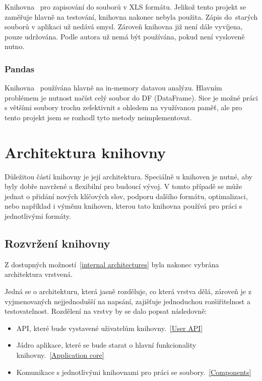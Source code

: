 Knihovna~\cite{xlwt} pro zapisování do souborů v XLS formátu. Jelikož tento projekt se zaměřuje hlavně na testování, knihovna nakonec nebyla použita. Zápis do~starých souborů v aplikaci už nedává smysl. Zároveň knihovna již není dále vyvíjena, pouze udržována. Podle autora už nemá být používána, pokud není vysloveně nutno.~\cite{xlwtEnd}

\subsubsection{Pandas}
\label{subsubsec:pandas}

Knihovna~\cite{Pandas} používána hlavně na in-memory datavou analýzu. Hlavním problémem je nutnost načíst celý soubor do DF (DataFrame). Sice je možné práci s většími soubory trochu zefektivnit s ohledem na využívanou paměť, ale pro tento projekt jsem se rozhodl tyto metody neimplementovat.~\cite{PandasScale}

\section{Architektura knihovny}

Důležitou částí knihovny je její architektura. Speciálně u knihoven je nutné, aby byly dobře navržené a flexibilní pro budoucí vývoj. V tomto případě se může jednat o přidání nových klíčových slov, podporu dalšího formátu, optimalizaci, nebo například i výměnu knihoven, kterou tato knihovna používá pro práci s jednotlivými formáty.

\subsection{Rozvržení knihovny}

Z dostupných možností~\ref{internal architectures} byla nakonec vybrána architektura vrstvená.

Jedná se o architekturu, která jasně rozděluje, co která vrstva dělá, zároveň je z vyjmenovaných nejjednodušší na napsání, zajišťuje jednoduchou rozšiřitelnost a testovatelnost. Rozdělení na vrstvy by se dalo popsat následovně:

\begin{itemize}
    \item API, které bude vystavené uživatelům knihovny.~\ref{User API}
    \item Jádro aplikace, které se bude starat o hlavní funkcionality knihovny.~\ref{Application core}
    \item Komunikace s jednotlivými knihovnami pro práci se soubory.~\ref{Components}
\end{itemize}

